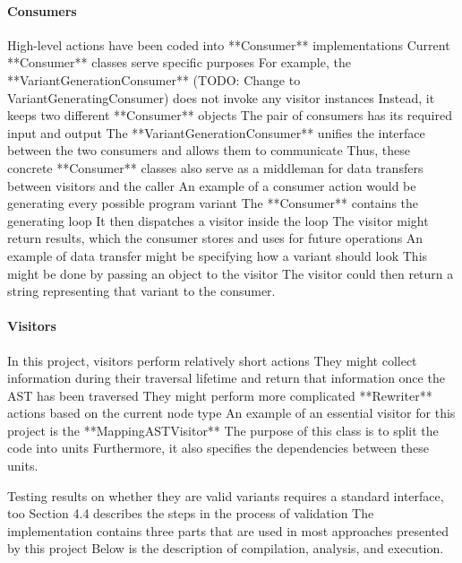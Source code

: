 {\paragraph{Consumers} High-level actions have been coded into **Consumer** implementations
Current **Consumer** classes serve specific purposes
For example, the **VariantGenerationConsumer** (TODO: Change to VariantGeneratingConsumer) does not invoke any visitor instances
Instead, it keeps two different **Consumer** objects
The pair of consumers has its required input and output
The **VariantGenerationConsumer** unifies the interface between the two consumers and allows them to communicate
Thus, these concrete **Consumer** classes also serve as a middleman for data transfers between visitors and the caller
An example of a consumer action would be generating every possible program variant
The **Consumer** contains the generating loop
It then dispatches a visitor inside the loop
The visitor might return results, which the consumer stores and uses for future operations
An example of data transfer might be specifying how a variant should look
This might be done by passing an object to the visitor
The visitor could then return a string representing that variant to the consumer.

\paragraph{Visitors} In this project, visitors perform relatively short actions
They might collect information during their traversal lifetime and return that information once the AST has been traversed
They might perform more complicated **Rewriter** actions based on the current node type
An example of an essential visitor for this project is the **MappingASTVisitor**
The purpose of this class is to split the code into units
Furthermore, it also specifies the dependencies between these units.

Testing results on whether they are valid variants requires a standard interface, too
Section 4.4 describes the steps in the process of validation
The implementation contains three parts that are used in most approaches presented by this project
Below is the description of compilation, analysis, and execution.

}
